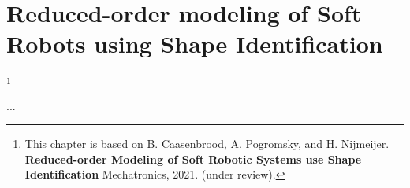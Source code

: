 \graphicspath{{3_Chapter/fig}}
\chapter{Reduced-order modeling of Soft Robots using Shape Identification}
{\let\thefootnote\relax\footnote{{\color{black}This chapter is based on B. Caasenbrood, A. Pogromsky, and H. Nijmeijer. \textbf{Reduced-order Modeling of Soft Robotic Systems use Shape Identification} Mechatronics, 2021. (under review).}}}
\label{chap:3}

\begin{chapter-abstract}
...

\end{chapter-abstract}

\clearpage
\Materialtrue %

